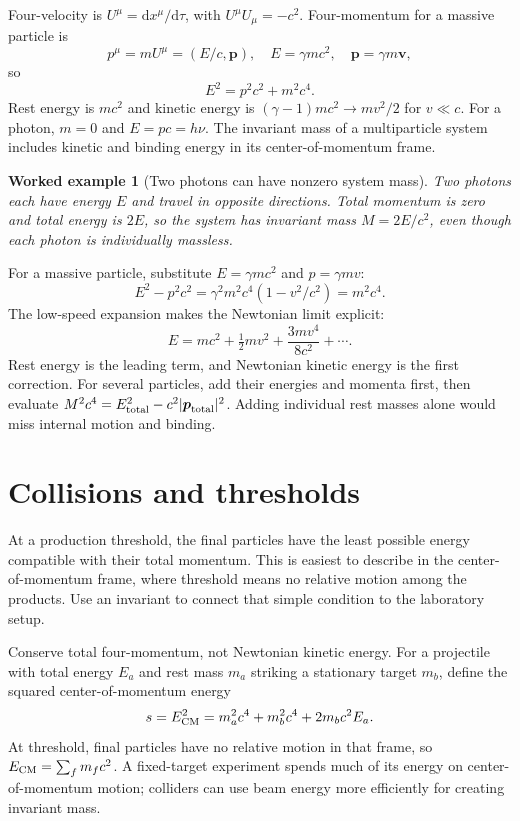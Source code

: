 \documentclass[11pt,oneside]{book}
\newcommand{\dd}{\mathrm{d}}
\newcommand{\vect}[1]{\boldsymbol{#1}}
\theoremstyle{reviewstyle}
\newtheorem{example}{Worked example}[chapter]
\begin{document}
Four-velocity is $U^\mu=\dd x^\mu/\dd\tau$, with $U^\mu U_\mu=-c^2$. Four-momentum for a massive particle is
\begin{equation}
p^\mu=mU^\mu=(E/c,\vect p),\quad
E=\gamma mc^2,\quad \vect p=\gamma m\vect v,
\end{equation}
so
\begin{equation}\boxed{E^2=p^2c^2+m^2c^4.}\end{equation}
Rest energy is $mc^2$ and kinetic energy is $(\gamma-1)mc^2\to mv^2/2$ for $v\ll c$. For a photon, $m=0$ and $E=pc=h\nu$. The invariant mass of a multiparticle system includes kinetic and binding energy in its center-of-momentum frame.
\begin{example}[Two photons can have nonzero system mass]
Two photons each have energy $E$ and travel in opposite directions. Total momentum is zero and total energy is $2E$, so the system has invariant mass $M=2E/c^2$, even though each photon is individually massless.
\end{example}

For a massive particle, substitute $E=\gamma mc^2$ and $p=\gamma mv$:
\begin{equation}
E^2-p^2c^2=\gamma^2m^2c^4(1-v^2/c^2)=m^2c^4.
\end{equation}
The low-speed expansion makes the Newtonian limit explicit:
\begin{equation}
E=mc^2+\tfrac12mv^2+\frac{3mv^4}{8c^2}+\cdots.
\end{equation}
Rest energy is the leading term, and Newtonian kinetic energy is the first correction. For several particles, add their energies and momenta first, then evaluate $M^2c^4=E_{\rm total}^2-c^2|\vect p_{\rm total}|^2$. Adding individual rest masses alone would miss internal motion and binding.

\section{Collisions and thresholds}
At a production threshold, the final particles have the least possible energy compatible with their total momentum. This is easiest to describe in the center-of-momentum frame, where threshold means no relative motion among the products. Use an invariant to connect that simple condition to the laboratory setup.

Conserve total four-momentum, not Newtonian kinetic energy. For a projectile with total energy $E_a$ and rest mass $m_a$ striking a stationary target $m_b$, define the squared center-of-momentum energy
\begin{equation}s=E_{\rm CM}^2=m_a^2c^4+m_b^2c^4+2m_bc^2E_a.\end{equation}
At threshold, final particles have no relative motion in that frame, so $E_{\rm CM}=\sum_fm_fc^2$. A fixed-target experiment spends much of its energy on center-of-momentum motion; colliders can use beam energy more efficiently for creating invariant mass.
\end{document}
